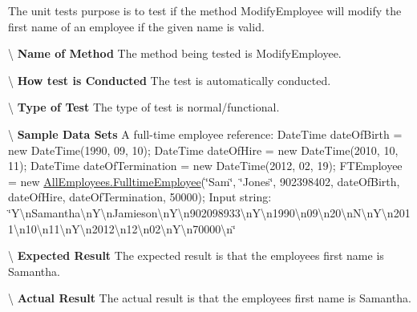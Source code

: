 The unit test\textquotesingle{}s purpose is to test if the method Modify\+Employee will modify the first name of an employee if the given name is valid. 

\textbackslash{} {\bfseries  Name of Method} The method being tested is Modify\+Employee.

\textbackslash{} {\bfseries  How test is Conducted} The test is automatically conducted.

\textbackslash{} {\bfseries  Type of Test} The type of test is normal/functional.

\textbackslash{} {\bfseries  Sample Data Sets} A full-\/time employee reference\+: Date\+Time date\+Of\+Birth = new Date\+Time(1990, 09, 10); Date\+Time date\+Of\+Hire = new Date\+Time(2010, 10, 11); Date\+Time date\+Of\+Termination = new Date\+Time(2012, 02, 19); F\+T\+Employee = new \hyperlink{class_all_employees_1_1_fulltime_employee}{All\+Employees.\+Fulltime\+Employee}(\char`\"{}\+Sam\char`\"{}, \char`\"{}\+Jones\char`\"{}, 902398402, date\+Of\+Birth, date\+Of\+Hire, date\+Of\+Termination, 50000); Input string\+: \char`\"{}\+Y\textbackslash{}n\+Samantha\textbackslash{}n\+Y\textbackslash{}n\+Jamieson\textbackslash{}n\+Y\textbackslash{}n902098933\textbackslash{}n\+Y\textbackslash{}n1990\textbackslash{}n09\textbackslash{}n20\textbackslash{}n\+N\textbackslash{}n\+Y\textbackslash{}n2011\textbackslash{}n10\textbackslash{}n11\textbackslash{}n\+Y\textbackslash{}n2012\textbackslash{}n12\textbackslash{}n02\textbackslash{}n\+Y\textbackslash{}n70000\textbackslash{}n\char`\"{}

\textbackslash{} {\bfseries  Expected Result} The expected result is that the employee\textquotesingle{}s first name is Samantha.

\textbackslash{} {\bfseries  Actual Result} The actual result is that the employee\textquotesingle{}s first name is Samantha. \hypertarget{class_the_company_1_1_tests_1_1_modify_employee_tests_a8c9493efb160a306c00673ae79fce155}{}
